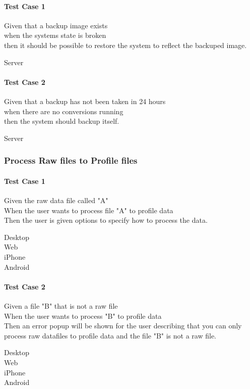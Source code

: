 \paragraph*{Test Case 1}
Given that a backup image exists \\ when the systems state is broken \\ then it should be possible to restore the system to reflect the backuped image.
\begin{description}
 \item[Server]
\end{description}
\paragraph*{Test Case 2}
Given that a backup has not been taken in 24 hours \\ when there are no conversions running \\ then the system should backup itself.
\begin{description}
 \item[Server]
\end{description}


\subsubsection{Process Raw files to Profile files}
\paragraph*{Test Case 1}
Given the raw data file called "A" \\ When the user wants to process file "A" to profile data \\ Then the user is given options to specify how to process the data.
\begin{description}
 \item[Desktop]
 \item[Web]
 \item[iPhone] \cmark
 \item[Android]
\end{description}
\paragraph*{Test Case 2}
Given a file "B" that is not a raw file \\ When the user wants to process "B" to profile data \\ Then an error popup will be shown for the user describing that you can only process raw datafiles to profile data and the file "B" is not a raw file.
\begin{description}
 \item[Desktop]
 \item[Web]
 \item[iPhone] \cmark
 \item[Android]
\end{description}
